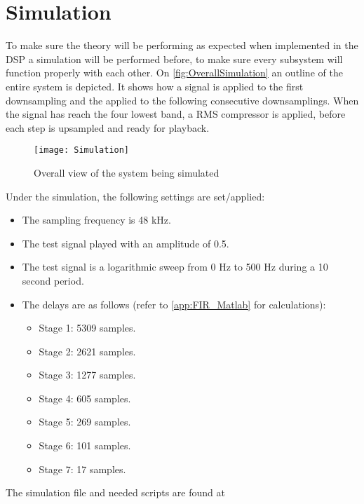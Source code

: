 \chapter{Simulation}
To make sure the theory will be performing as expected when implemented in the DSP a simulation will be performed before, to make sure every subsystem will function properly with each other. On \autoref{fig:OverallSimulation} an outline of the entire system is depicted. It shows how a signal is applied to the first downsampling and the applied to the following consecutive downsamplings. When the signal has reach the four lowest band, a RMS compressor is applied, before each step is upsampled and ready for playback.

\begin{figure}[H]
\centering
\texttt{[image: Simulation]}
\label{fig:OverallSimulation}
\caption{Overall view of the system being simulated}
\end{figure}

Under the simulation, the following settings are set/applied:
\begin{itemize}
\item The sampling frequency is 48 kHz.
\item The test signal played with an amplitude of 0.5.
\item The test signal is a logarithmic sweep from 0 Hz to 500 Hz during a 10 second period.
\item The delays are as follows (refer to \autoref{app:FIR_Matlab} for calculations):
\begin{itemize}
\item Stage 1: 5309 samples.
\item Stage 2: 2621 samples.
\item Stage 3: 1277 samples.
\item Stage 4: 605 samples.
\item Stage 5: 269 samples.
\item Stage 6: 101 samples.
\item Stage 7: 17 samples.
\end{itemize}
\end{itemize}

The simulation file and needed scripts are found at 


